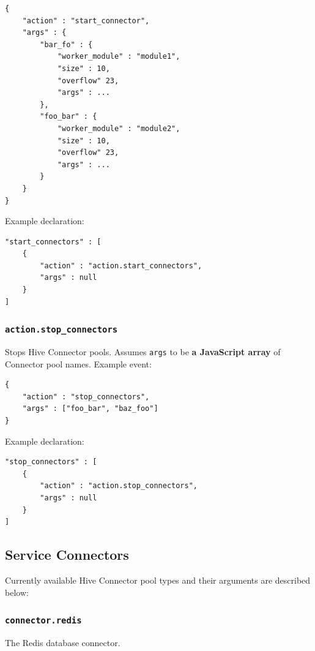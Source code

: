 \documentclass[a4paper]{article}
\begin{document}
\begin{verbatim}
{
    "action" : "start_connector",
    "args" : {
        "bar_fo" : {
            "worker_module" : "module1",
            "size" : 10,
            "overflow" 23,
            "args" : ...
        },
        "foo_bar" : {
            "worker_module" : "module2",
            "size" : 10,
            "overflow" 23,
            "args" : ...
        }
    }
}
\end{verbatim}




\noindent
Example declaration:

\begin{verbatim}
"start_connectors" : [
    {
        "action" : "action.start_connectors",
        "args" : null
    }
]
\end{verbatim}
\subsubsection{\texttt{action.stop\_connectors}}
\label{sec-9-3-9}

Stops Hive Connector pools. Assumes \texttt{args} to be \textbf{a JavaScript array} of Connector pool names. Example event:


\begin{verbatim}
{
    "action" : "stop_connectors",
    "args" : ["foo_bar", "baz_foo"]
}
\end{verbatim}




\noindent
Example declaration:

\begin{verbatim}
"stop_connectors" : [
    {
        "action" : "action.stop_connectors",
        "args" : null
    }
]
\end{verbatim}
\subsection{Service Connectors}
\label{sec-9-4}
\label{ref-connectors}

Currently available Hive Connector pool types and their arguments are described below:
\subsubsection{\texttt{connector.redis}}
\label{sec-9-4-1}

The Redis database connector.
\end{document}
